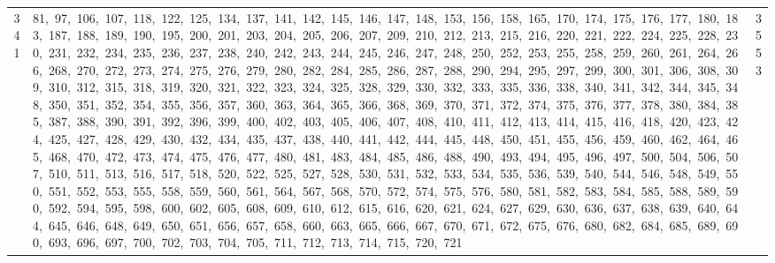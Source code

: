 \begin{longtable}{c|p{}|r}
341 & 81,\ 97,\ 106,\ 107,\ 118,\ 122,\ 125,\ 134,\ 137,\ 141,\ 142,\ 145,\ 146,\ 147,\ 148,\ 153,\ 156,\ 158,\ 165,\ 170,\ 174,\ 175,\ 176,\ 177,\ 180,\ 183,\ 187,\ 188,\ 189,\ 190,\ 195,\ 200,\ 201,\ 203,\ 204,\ 205,\ 206,\ 207,\ 209,\ 210,\ 212,\ 213,\ 215,\ 216,\ 220,\ 221,\ 222,\ 224,\ 225,\ 228,\ 230,\ 231,\ 232,\ 234,\ 235,\ 236,\ 237,\ 238,\ 240,\ 242,\ 243,\ 244,\ 245,\ 246,\ 247,\ 248,\ 250,\ 252,\ 253,\ 255,\ 258,\ 259,\ 260,\ 261,\ 264,\ 266,\ 268,\ 270,\ 272,\ 273,\ 274,\ 275,\ 276,\ 279,\ 280,\ 282,\ 284,\ 285,\ 286,\ 287,\ 288,\ 290,\ 294,\ 295,\ 297,\ 299,\ 300,\ 301,\ 306,\ 308,\ 309,\ 310,\ 312,\ 315,\ 318,\ 319,\ 320,\ 321,\ 322,\ 323,\ 324,\ 325,\ 328,\ 329,\ 330,\ 332,\ 333,\ 335,\ 336,\ 338,\ 340,\ 341,\ 342,\ 344,\ 345,\ 348,\ 350,\ 351,\ 352,\ 354,\ 355,\ 356,\ 357,\ 360,\ 363,\ 364,\ 365,\ 366,\ 368,\ 369,\ 370,\ 371,\ 372,\ 374,\ 375,\ 376,\ 377,\ 378,\ 380,\ 384,\ 385,\ 387,\ 388,\ 390,\ 391,\ 392,\ 396,\ 399,\ 400,\ 402,\ 403,\ 405,\ 406,\ 407,\ 408,\ 410,\ 411,\ 412,\ 413,\ 414,\ 415,\ 416,\ 418,\ 420,\ 423,\ 424,\ 425,\ 427,\ 428,\ 429,\ 430,\ 432,\ 434,\ 435,\ 437,\ 438,\ 440,\ 441,\ 442,\ 444,\ 445,\ 448,\ 450,\ 451,\ 455,\ 456,\ 459,\ 460,\ 462,\ 464,\ 465,\ 468,\ 470,\ 472,\ 473,\ 474,\ 475,\ 476,\ 477,\ 480,\ 481,\ 483,\ 484,\ 485,\ 486,\ 488,\ 490,\ 493,\ 494,\ 495,\ 496,\ 497,\ 500,\ 504,\ 506,\ 507,\ 510,\ 511,\ 513,\ 516,\ 517,\ 518,\ 520,\ 522,\ 525,\ 527,\ 528,\ 530,\ 531,\ 532,\ 533,\ 534,\ 535,\ 536,\ 539,\ 540,\ 544,\ 546,\ 548,\ 549,\ 550,\ 551,\ 552,\ 553,\ 555,\ 558,\ 559,\ 560,\ 561,\ 564,\ 567,\ 568,\ 570,\ 572,\ 574,\ 575,\ 576,\ 580,\ 581,\ 582,\ 583,\ 584,\ 585,\ 588,\ 589,\ 590,\ 592,\ 594,\ 595,\ 598,\ 600,\ 602,\ 605,\ 608,\ 609,\ 610,\ 612,\ 615,\ 616,\ 620,\ 621,\ 624,\ 627,\ 629,\ 630,\ 636,\ 637,\ 638,\ 639,\ 640,\ 644,\ 645,\ 646,\ 648,\ 649,\ 650,\ 651,\ 656,\ 657,\ 658,\ 660,\ 663,\ 665,\ 666,\ 667,\ 670,\ 671,\ 672,\ 675,\ 676,\ 680,\ 682,\ 684,\ 685,\ 689,\ 690,\ 693,\ 696,\ 697,\ 700,\ 702,\ 703,\ 704,\ 705,\ 711,\ 712,\ 713,\ 714,\ 715,\ 720,\ 721 & 3553 \\

\end{longtable}
